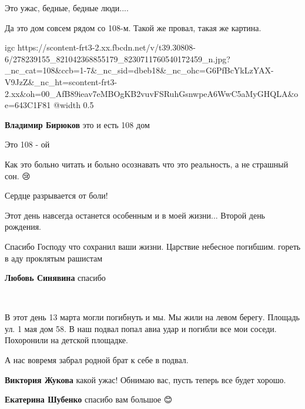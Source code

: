 
Это ужас, бедные, бедные люди....


Да это дом совсем рядом со 108-м. Такой же провал, такая же картина.

\ifcmt
  igc https://scontent-frt3-2.xx.fbcdn.net/v/t39.30808-6/278239155_821042368855179_8230711760540172459_n.jpg?_nc_cat=108&ccb=1-7&_nc_sid=dbeb18&_nc_ohc=G6PfBcYkLzYAX-V9JzZ&_nc_ht=scontent-frt3-2.xx&oh=00_AfB89ieav7eMBOgKB2vuvFSRuhGsnwpeA6WwC5aMyGHQLA&oe=643C1F81
	@width 0.5
\fi

\begin{itemize} %
\textbf{Владимир Бирюков} это и есть 108 дом
\end{itemize} %


Это 108 - ой


Как это больно читать и больно осознавать что это реальность, а не страшный сон. 😢🙏


Сердце разрывается от боли!

Этот день навсегда останется особенным и в моей жизни... Второй день рождения.


Спасибо Господу что сохранил ваши жизни. Царствие небесное погибшим. гореть в
аду проклятым рашистам

\begin{itemize} %
\textbf{Любовь Синявина} спасибо
\end{itemize} %


🙏🙏🙏🙏🙏🙏🙏🙏🙏


В этот день 13 марта могли погибнуть и мы. Мы жили на левом берегу. Площадь ул.
1 мая дом 58. В наш подвал попал авиа удар и погибли все мои соседи. Похоронили
на детской площадке.

А нас вовремя забрал родной брат к себе в подвал.

\begin{itemize} %
\textbf{Виктория Жукова} какой ужас! Обнимаю вас, пусть теперь все будет хорошо.

\textbf{Екатерина Шубенко} спасибо вам большое 😊
\end{itemize} %

